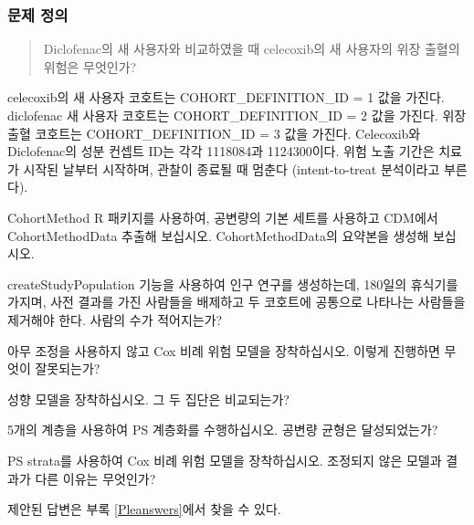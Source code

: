 \documentclass[11pt]{book}
\theoremstyle{definition}
\theoremstyle{definition}
\theoremstyle{definition}
\theoremstyle{remark}
\let\BeginKnitrBlock\begin \let\EndKnitrBlock\end
\begin{document}
\subsubsection*{문제 정의}\label{--2}

\begin{quote}
Diclofenac의 새 사용자와 비교하였을 때 celecoxib의 새 사용자의 위장
출혈의 위험은 무엇인가?
\end{quote}

celecoxib의 새 사용자 코호트는 COHORT\_DEFINITION\_ID = 1 값을 가진다.
diclofenac 새 사용자 코호트는 COHORT\_DEFINITION\_ID = 2 값을 가진다.
위장 출혈 코호트는 COHORT\_DEFINITION\_ID = 3 값을 가진다. Celecoxib와
Diclofenac의 성분 컨셉트 ID는 각각 1118084과 1124300이다. 위험 노출
기간은 치료가 시작된 날부터 시작하며, 관찰이 종료될 때 멈춘다
(intent-to-treat 분석이라고 부른다).

\BeginKnitrBlock{exercise}
\protect\hypertarget{exr:exercisePle1}{}{\label{exr:exercisePle1}
}CohortMethod R 패키지를 사용하여, 공변량의 기본 세트를 사용하고 CDM에서
CohortMethodData 추출해 보십시오. CohortMethodData의 요약본을 생성해
보십시오.
\EndKnitrBlock{exercise}

\BeginKnitrBlock{exercise}
\protect\hypertarget{exr:exercisePle2}{}{\label{exr:exercisePle2}
}createStudyPopulation 기능을 사용하여 인구 연구를 생성하는데, 180일의
휴식기를 가지며, 사전 결과를 가진 사람들을 배제하고 두 코호트에 공통으로
나타나는 사람들을 제거해야 한다. 사람의 수가 적어지는가?
\EndKnitrBlock{exercise}

\BeginKnitrBlock{exercise}
\protect\hypertarget{exr:exercisePle3}{}{\label{exr:exercisePle3} }아무
조정을 사용하지 않고 Cox 비례 위험 모델을 장착하십시오. 이렇게 진행하면
무엇이 잘못되는가?
\EndKnitrBlock{exercise}

\BeginKnitrBlock{exercise}
\protect\hypertarget{exr:exercisePle4}{}{\label{exr:exercisePle4} }성향
모델을 장착하십시오. 그 두 집단은 비교되는가?
\EndKnitrBlock{exercise}

\BeginKnitrBlock{exercise}
\protect\hypertarget{exr:exercisePle5}{}{\label{exr:exercisePle5} }5개의
계층을 사용하여 PS 계층화를 수행하십시오. 공변량 균형은 달성되었는가?
\EndKnitrBlock{exercise}

\BeginKnitrBlock{exercise}
\protect\hypertarget{exr:exercisePle6}{}{\label{exr:exercisePle6} }PS
strata를 사용하여 Cox 비례 위험 모델을 장착하십시오. 조정되지 않은
모델과 결과가 다른 이유는 무엇인가?
\EndKnitrBlock{exercise}

제안된 답변은 부록 \ref{Pleanswers}에서 찾을 수 있다.
\end{document}
